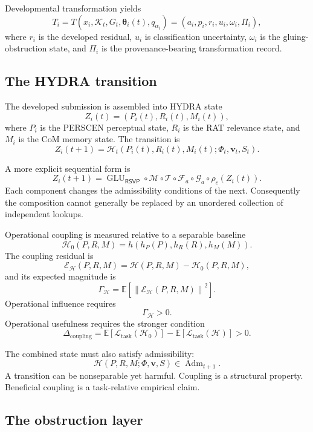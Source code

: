 \documentclass[11pt]{article}
\theoremstyle{definition}
\DeclareMathOperator{\Adm}{Adm}
\newcommand{\E}{\mathbb{E}}
\newcommand{\K}{\mathcal{K}}
\newcommand{\thetaState}{\boldsymbol{\theta}}
\newcommand{\FieldPhi}{\Phi}
\newcommand{\FieldV}{\mathbf{v}}
\newcommand{\FieldS}{S}
\newcommand{\RSVP}{\mathsf{RSVP}}
\begin{document}
Developmental transformation yields
\[
T_i
=
T(
x_i,
\K_t,
G_t,
\thetaState_i(t),
q_{\alpha_i}
)
=
\left(
a_i,
p_i,
r_i,
u_i,
\omega_i,
\Pi_i
\right),
\]
where \(r_i\) is the developed residual, \(u_i\) is classification uncertainty, \(\omega_i\) is the gluing-obstruction state, and \(\Pi_i\) is the provenance-bearing transformation record.

\subsection{The HYDRA transition}

The developed submission is assembled into HYDRA state
\[
Z_i(t)
=
\left(
P_i(t),
R_i(t),
M_i(t)
\right),
\]
where \(P_i\) is the PERSCEN perceptual state, \(R_i\) is the RAT relevance state, and \(M_i\) is the CoM memory state. The transition is
\[
Z_i(t+1)
=
\mathcal{H}_t
\left(
P_i(t),
R_i(t),
M_i(t);
\FieldPhi_t,
\FieldV_t,
\FieldS_t
\right).
\]

A more explicit sequential form is
\[
Z_i(t+1)
=
\operatorname{GLU}_{\RSVP}
\circ
\mathcal{M}
\circ
\mathcal{T}
\circ
\mathcal{F}_{a}
\circ
\mathcal{G}_{a}
\circ
\rho_c
\left(
Z_i(t)
\right).
\]
Each component changes the admissibility conditions of the next. Consequently the composition cannot generally be replaced by an unordered collection of independent lookups.

Operational coupling is measured relative to a separable baseline
\[
\mathcal{H}_0(P,R,M)
=
h\!\left(
h_P(P),
h_R(R),
h_M(M)
\right).
\]
The coupling residual is
\[
\mathcal{E}_{\mathcal{H}}(P,R,M)
=
\mathcal{H}(P,R,M)-\mathcal{H}_0(P,R,M),
\]
and its expected magnitude is
\[
\Gamma_{\mathcal{H}}
=
\E
\left[
\left\|
\mathcal{E}_{\mathcal{H}}(P,R,M)
\right\|^2
\right].
\]
Operational influence requires
\[
\Gamma_{\mathcal{H}}>0.
\]
Operational usefulness requires the stronger condition
\[
\Delta_{\mathrm{coupling}}
=
\E[
\mathcal{L}_{\mathrm{task}}(\mathcal{H}_0)
]
-
\E[
\mathcal{L}_{\mathrm{task}}(\mathcal{H})
]
>0.
\]

The combined state must also satisfy admissibility:
\[
\mathcal{H}(P,R,M;\FieldPhi,\FieldV,\FieldS)
\in
\Adm_{t+1}.
\]
A transition can be nonseparable yet harmful. Coupling is a structural property. Beneficial coupling is a task-relative empirical claim.

\subsection{The obstruction layer}
\end{document}
